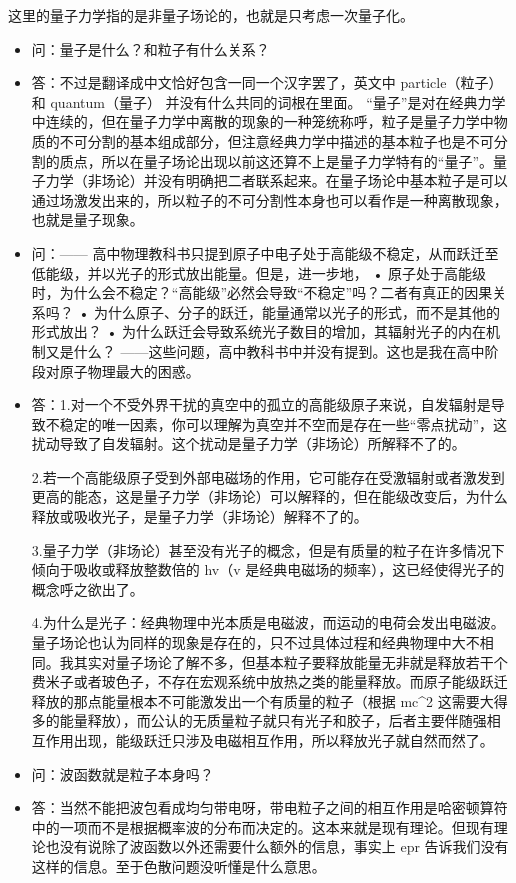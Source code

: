 
\begin{issues}
\issueDraft
\end{issues}

这里的量子力学指的是非量子场论的，也就是只考虑一次量子化。

\begin{itemize}
\item 问：量子是什么？和粒子有什么关系？
\item 答：不过是翻译成中文恰好包含一同一个汉字罢了，英文中 particle（粒子） 和 quantum（量子） 并没有什么共同的词根在里面。 “量子”是对在经典力学中连续的，但在量子力学中离散的现象的一种笼统称呼，粒子是量子力学中物质的不可分割的基本组成部分，但注意经典力学中描述的基本粒子也是不可分割的质点，所以在量子场论出现以前这还算不上是量子力学特有的“量子”。量子力学（非场论）并没有明确把二者联系起来。在量子场论中基本粒子是可以通过场激发出来的，所以粒子的不可分割性本身也可以看作是一种离散现象，也就是量子现象。
\item 问：—— 高中物理教科书只提到原子中电子处于高能级不稳定，从而跃迁至低能级，并以光子的形式放出能量。但是，进一步地，
• 原子处于高能级时，为什么会不稳定？“高能级”必然会导致“不稳定”吗？二者有真正的因果关系吗？
• 为什么原子、分子的跃迁，能量通常以光子的形式，而不是其他的形式放出？
• 为什么跃迁会导致系统光子数目的增加，其辐射光子的内在机制又是什么？
——这些问题，高中教科书中并没有提到。这也是我在高中阶段对原子物理最大的困惑。
\item 答：1.对一个不受外界干扰的真空中的孤立的高能级原子来说，自发辐射是导致不稳定的唯一因素，你可以理解为真空并不空而是存在一些“零点扰动”，这扰动导致了自发辐射。这个扰动是量子力学（非场论）所解释不了的。

2.若一个高能级原子受到外部电磁场的作用，它可能存在受激辐射或者激发到更高的能态，这是量子力学（非场论）可以解释的，但在能级改变后，为什么释放或吸收光子，是量子力学（非场论）解释不了的。

3.量子力学（非场论）甚至没有光子的概念，但是有质量的粒子在许多情况下倾向于吸收或释放整数倍的 hv（v 是经典电磁场的频率），这已经使得光子的概念呼之欲出了。

4.为什么是光子：经典物理中光本质是电磁波，而运动的电荷会发出电磁波。量子场论也认为同样的现象是存在的，只不过具体过程和经典物理中大不相同。我其实对量子场论了解不多，但基本粒子要释放能量无非就是释放若干个费米子或者玻色子，不存在宏观系统中放热之类的能量释放。而原子能级跃迁释放的那点能量根本不可能激发出一个有质量的粒子（根据 mc^2 这需要大得多的能量释放），而公认的无质量粒子就只有光子和胶子，后者主要伴随强相互作用出现，能级跃迁只涉及电磁相互作用，所以释放光子就自然而然了。
\item 问：波函数就是粒子本身吗？
\item 答：当然不能把波包看成均匀带电呀，带电粒子之间的相互作用是哈密顿算符中的一项而不是根据概率波的分布而决定的。这本来就是现有理论。但现有理论也没有说除了波函数以外还需要什么额外的信息，事实上 epr 告诉我们没有这样的信息。至于色散问题没听懂是什么意思。


\end{itemize}
